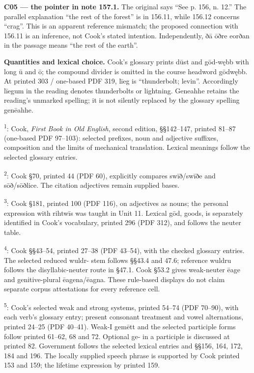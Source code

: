 \textbf{C05 — the pointer in note 157.1.} The original says “See p. 156, n. 12.” The parallel explanation “the rest of the forest” is in 156.11, while 156.12 concerns “crag”. This is an apparent reference mismatch; the proposed connection with 156.11 is an inference, not Cook’s stated intention. Independently, ðā ōðre eorðan in the passage means “the rest of the earth”.

\textbf{Quantities and lexical choice.} Cook’s glossary prints dūst and gōd-wębb with long ū and ō; the compound divider is omitted in the course headword gōdwębb. At printed 303 /\allowbreak{} one-based PDF 319, līeg is “thunderbolt; levin”. Accordingly līegum in the reading denotes thunderbolts or lightning. Geneahhe retains the reading’s unmarked spelling; it is not silently replaced by the glossary spelling genēahhe.

\textsuperscript{1}: Cook, \emph{First Book in Old English}, second edition, §§142–147, printed 81–87 (one-based PDF 97–103): selected prefixes, noun and adjective suffixes, composition and the limits of mechanical translation. Lexical meanings follow the selected glossary entries.

\textsuperscript{2}: Cook §70, printed 44 (PDF 60), explicitly compares swīð/\allowbreak{}swīðe and sōð/\allowbreak{}sōðlice. The citation adjectives remain supplied bases.

\textsuperscript{3}: Cook §181, printed 100 (PDF 116), on adjectives as nouns; the personal expression with rihtwīs was taught in Unit 11. Lexical gōd, goods, is separately identified in Cook’s vocabulary, printed 296 (PDF 312), and follows the neuter table.

\textsuperscript{4}: Cook §§43–54, printed 27–38 (PDF 43–54), with the checked glossary entries. The selected reduced wuldr- stem follows §§43.4 and 47.6; reference wuldru follows the disyllabic-neuter route in §47.1. Cook §53.2 gives weak-neuter ēage and genitive-plural ēagena/\allowbreak{}ēagna. These rule-based displays do not claim separate corpus attestations for every reference cell.

\textsuperscript{5}: Cook’s selected weak and strong systems, printed 54–74 (PDF 70–90), with each verb’s glossary entry; present consonant treatment and vowel alternations, printed 24–25 (PDF 40–41). Weak-I gemētt and the selected participle forms follow printed 61–62, 68 and 72. Optional ge- in a participle is discussed at printed 82. Government follows the selected lexical entries and §§156, 164, 172, 184 and 196. The locally supplied speech phrase is supported by Cook printed 153 and 159; the lifetime expression by printed 159.

